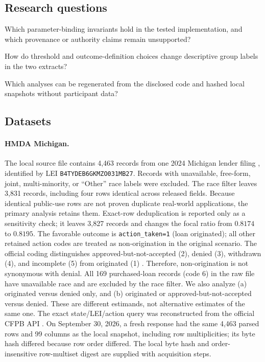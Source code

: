 \documentclass[10pt]{article}
\newcommand{\code}[1]{\texttt{#1}}
\begin{document}
\subsection{Research questions}

\begin{description}[leftmargin=3.6em,style=nextline]
  \item[RQ1] Which parameter-binding invariants hold in the tested
  implementation, and which provenance or authority claims remain unsupported?
  \item[RQ2] How do threshold and outcome-definition choices change descriptive
  group labels in the two extracts?
  \item[RQ3] Which analyses can be regenerated from the disclosed code and
  hashed local snapshots without participant data?
\end{description}

\subsection{Datasets}

\paragraph{HMDA Michigan.}
The local source file contains 4,463 records from one 2024 Michigan lender
filing \cite{cfpbHMDA}, identified by LEI \code{B4TYDEB6GKMZO031MB27}.
Records with unavailable, free-form, joint, multi-minority, or ``Other'' race
labels were excluded. The race filter leaves 3,831 records, including four rows
identical across released fields. Because identical public-use rows are not
proven duplicate real-world applications, the primary analysis retains them.
Exact-row deduplication is reported only as a sensitivity check; it leaves
3,827 records and changes the focal ratio from $0.8174$ to $0.8195$. The
favorable outcome is \code{action\_taken=1} (loan originated); all
other retained action codes are treated as non-origination in the original
scenario. The official coding distinguishes approved-but-not-accepted (2),
denied (3), withdrawn (4), and incomplete (5) from originated (1)
\cite{cfpbHMDAguide}. Therefore, non-origination is not synonymous with denial.
All 169 purchased-loan records (code 6) in the raw file have unavailable race
and are excluded by the race filter.
We also analyze (a) originated versus denied only, and (b) originated or
approved-but-not-accepted versus denied. These are different estimands, not
alternative estimates of the same one. The exact state/LEI/action query was
reconstructed from the official CFPB API \cite{cfpbAPI}. On September 30, 2026,
a fresh response had the same 4,463 parsed rows and 99 columns as the local
snapshot, including row multiplicities; its byte hash differed because row
order differed. The local byte hash and order-insensitive row-multiset digest
are supplied with acquisition steps.
\end{document}

